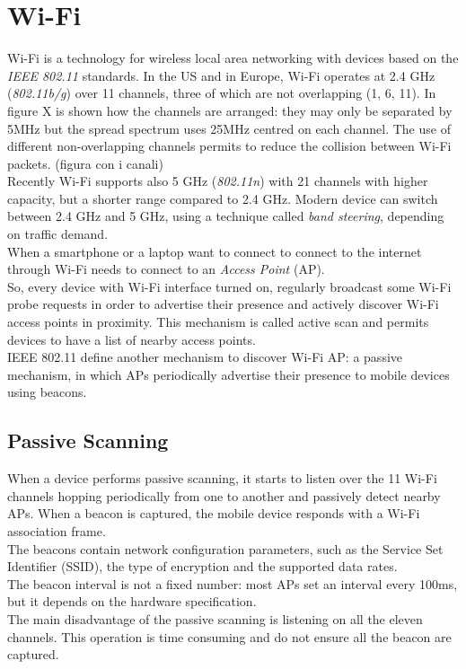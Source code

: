 \section{Wi-Fi}
Wi-Fi is a technology for wireless local area networking with devices based on the \textit{IEEE 802.11} standards. In the US and in Europe, Wi-Fi operates at 2.4 GHz (\textit{802.11b/g}) over 11 channels, three of which are not overlapping (1, 6, 11). In figure X is shown how the channels are arranged: they may only be separated by 5MHz but the spread spectrum uses 25MHz centred on each channel. The use of different non-overlapping channels permits to reduce the collision between Wi-Fi packets. (figura con i canali)\\
\linebreak
Recently Wi-Fi supports also 5 GHz (\textit{802.11n}) with 21 channels with higher capacity, but a shorter range compared to 2.4 GHz. Modern device can switch between 2.4 GHz and 5 GHz, using a technique called \textit{band steering}, depending on traffic demand.\\
\linebreak
When a smartphone or a laptop want to connect to connect to the internet through Wi-Fi needs to connect to an \textit{Access Point} (AP).\\
So, every device with Wi-Fi interface turned on, regularly broadcast some Wi-Fi probe requests in order to advertise their presence and actively discover Wi-Fi access points  in proximity. This mechanism is called active scan and permits devices to have a list of nearby access points. \\
IEEE 802.11 define another mechanism to discover Wi-Fi AP: a passive mechanism, in which APs periodically advertise their presence to mobile devices using beacons.
\subsection{Passive Scanning}
When a device performs passive scanning, it starts to listen over the 11 Wi-Fi channels hopping periodically from one to another and passively detect nearby APs. When a beacon is captured, the mobile device responds with a Wi-Fi association frame.\\
The beacons contain network configuration parameters, such as the Service Set Identifier (SSID), the type of encryption and the supported data rates.\\
The beacon interval is not a fixed number: most APs set an interval every 100ms, but it depends on the hardware specification.\\
The main disadvantage of the passive scanning is listening on all the eleven channels. This operation is time consuming and do not ensure all the beacon are captured.
